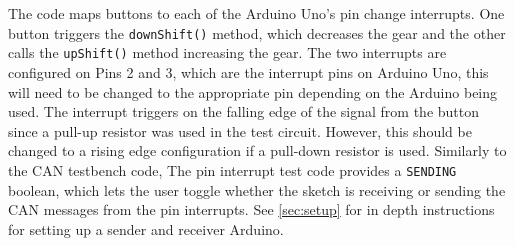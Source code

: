 \documentclass[letterpaper]{article}
\begin{document}
The code maps buttons to each of the Arduino Uno's pin change interrupts. One
button triggers the \lstinline{downShift()} method, which decreases the gear and
the other calls the \lstinline{upShift()} method increasing the gear. The two
interrupts are configured on Pins 2 and 3, which are the interrupt pins on
Arduino Uno, this will need to be changed to the appropriate pin depending on the
Arduino being used. The interrupt triggers on the falling edge of the signal
from the button since a pull-up resistor was used in the test circuit. However,
this should be changed to a rising edge configuration if a pull-down resistor is
used. Similarly to the CAN testbench code, The pin interrupt test code provides
a \lstinline{SENDING} boolean, which lets the user toggle whether the sketch is
receiving or sending the CAN messages from the pin interrupts. See 
\autoref{sec:setup} for in depth instructions for setting up a
sender and receiver Arduino.
\end{document}
